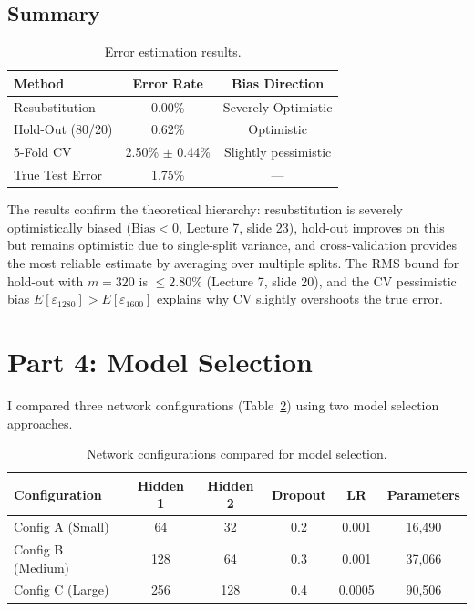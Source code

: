 \documentclass[11pt]{article}
\begin{document}
\subsection{Summary}
\begin{table}[H]
	\centering
	\caption{Error estimation results.}
	\begin{tabular}{lcc}
		\toprule
		Method           & Error Rate          & Bias Direction       \\
		\midrule
		Resubstitution   & 0.00\%              & Severely Optimistic  \\
		Hold-Out (80/20) & 0.62\%              & Optimistic           \\
		5-Fold CV        & 2.50\% $\pm$ 0.44\% & Slightly pessimistic \\
		True Test Error  & 1.75\%              & ---                  \\
		\bottomrule
	\end{tabular}
	\label{tab:error_est}
\end{table}

The results confirm the theoretical hierarchy: resubstitution is severely optimistically biased ($\text{Bias} < 0$, Lecture 7, slide 23), hold-out improves on this but remains optimistic due to single-split variance, and cross-validation provides the most reliable estimate by averaging over multiple splits. The RMS bound for hold-out with $m = 320$ is $\leq 2.80\%$ (Lecture 7, slide 20), and the CV pessimistic bias $E[\varepsilon_{1280}] > E[\varepsilon_{1600}]$ explains why CV slightly overshoots the true error.

\section{Part 4: Model Selection}

I compared three network configurations (Table~\ref{tab:configs}) using two model selection approaches.

\begin{table}[H]
	\centering
	\caption{Network configurations compared for model selection.}
	\begin{tabular}{lccccc}
		\toprule
		Configuration     & Hidden 1 & Hidden 2 & Dropout & LR     & Parameters \\
		\midrule
		Config A (Small)  & 64       & 32       & 0.2     & 0.001  & 16,490     \\
		Config B (Medium) & 128      & 64       & 0.3     & 0.001  & 37,066     \\
		Config C (Large)  & 256      & 128      & 0.4     & 0.0005 & 90,506     \\
		\bottomrule
	\end{tabular}
	\label{tab:configs}
\end{table}
\end{document}
